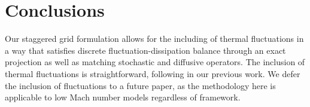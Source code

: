 \documentclass[final]{siamltex}
\begin{document}
\clearpage

\section{Conclusions}

Our staggered grid formulation allows for the including of thermal fluctuations
in a way that satisfies discrete fluctuation-dissipation balance through an
exact projection as well as matching stochastic and diffusive operators.
The inclusion of thermal fluctuations is straightforward, following in our previous work.
We defer the inclusion of fluctuations to a future paper, as
the methodology here is applicable to low Mach number models regardless of framework.



\end{document}
